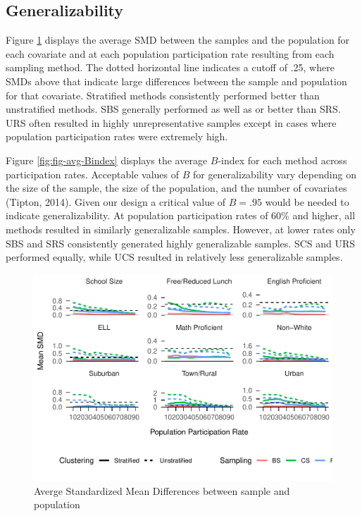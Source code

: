 \documentclass[man,floatsintext]{apa6}
\theoremstyle{definition}
\theoremstyle{definition}
\theoremstyle{definition}
\theoremstyle{remark}
\begin{document}
\hypertarget{generalizability-1}{%
\subsection{Generalizability}\label{generalizability-1}}

Figure \ref{fig:fig-SMD-by-Var} displays the average SMD between the
samples and the population for each covariate and at each population
participation rate resulting from each sampling method. The dotted
horizontal line indicates a cutoff of .25, where SMDs above that
indicate large differences between the sample and population for that
covariate. Stratified methods consistently performed better than
unstratified methods. SBS generally performed as well as or better than
SRS. URS often resulted in highly unrepresentative samples except in
cases where population participation rates were extremely high.

Figure \ref{fig:fig-avg-Bindex} displays the average \(B\)-index for
each method across participation rates. Acceptable values of \(B\) for
generalizability vary depending on the size of the sample, the size of
the population, and the number of covariates (Tipton, 2014). Given our
design a critical value of \(B = .95\) would be needed to indicate
generalizability. At population participation rates of 60\% and higher,
all methods resulted in similarly generalizable samples. However, at
lower rates only SBS and SRS consistently generated highly generalizable
samples. SCS and URS performed equally, while UCS resulted in relatively
less generalizable samples.

\begin{figure}
\centering
\includegraphics{GenSamp_Paper_files/figure-latex/fig-SMD-by-Var-1.pdf}
\caption{\label{fig:fig-SMD-by-Var}Averge Standardized Mean Differences
between sample and population}
\end{figure}
\end{document}
